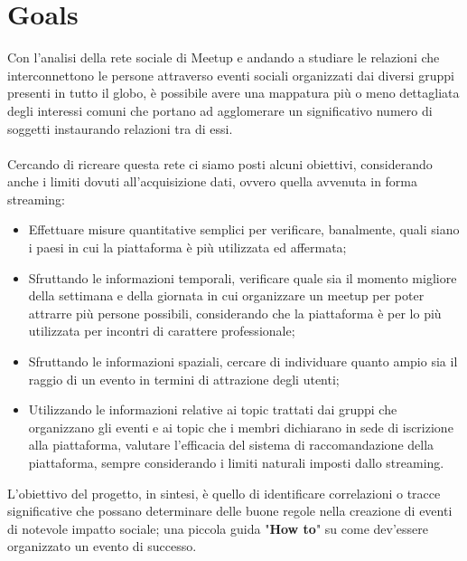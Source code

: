 \documentclass[fleqn,10pt]{SelfArx} %
\begin{document}
\section{Goals}
{\small
Con l'analisi della rete sociale di Meetup e andando a studiare le relazioni che interconnettono le persone attraverso eventi sociali organizzati dai diversi gruppi presenti in tutto il globo, è possibile avere una mappatura più o meno dettagliata degli interessi comuni che portano ad agglomerare un significativo numero di soggetti instaurando relazioni tra di essi. \\
\\
Cercando di ricreare questa rete ci siamo posti alcuni obiettivi, considerando anche i limiti dovuti all'acquisizione dati, ovvero quella avvenuta in forma streaming:
\begin{itemize}
\item Effettuare misure quantitative semplici per verificare, banalmente, quali siano i paesi in cui la piattaforma è più utilizzata ed affermata;
\item Sfruttando le informazioni temporali, verificare quale sia il momento migliore della settimana e della giornata in cui organizzare un meetup per poter attrarre più persone possibili, considerando che la piattaforma è per lo più utilizzata per incontri di carattere professionale;
\item Sfruttando le informazioni spaziali, cercare di individuare quanto ampio sia il raggio di un evento in termini di attrazione degli utenti;
\item Utilizzando le informazioni relative ai topic trattati dai gruppi che organizzano gli eventi e ai topic che i membri dichiarano in sede di iscrizione alla piattaforma, valutare l'efficacia del sistema di raccomandazione della piattaforma, sempre considerando i limiti naturali imposti dallo streaming.
\end{itemize}
L'obiettivo del progetto, in sintesi, è quello di identificare correlazioni o tracce significative che possano determinare delle buone regole nella creazione di eventi di notevole impatto sociale; una piccola guida "\textbf{How to}" su come dev'essere organizzato un evento di successo.
}
\newpage
\end{document}
